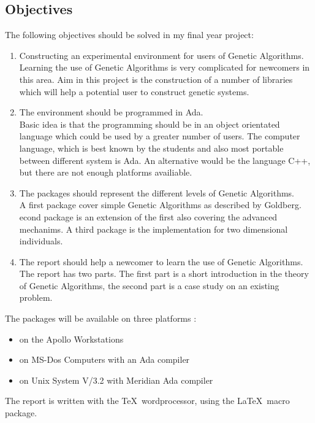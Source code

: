
\subsection{Objectives}
The following objectives should be solved in my final year project:
\begin{enumerate}
\item Constructing an experimental environment for users of Genetic Algorithms.\\
Learning the use of Genetic Algorithms is very complicated for newcomers in this
area. Aim in this project is the construction of a number of libraries which
will help a potential user to construct genetic systems.
\item The environment should be programmed in Ada.\\
Basic idea is that the programming should be in an object orientated language which could be used
by a greater number of users. The computer language, which is best known by the
students and also most portable between different system is Ada. An alternative
would be the language C++, but there are not enough platforms availiable.
\item The packages should represent the different levels of Genetic Algorithms.\\
A first package cover simple Genetic Algorithms as described by Goldberg\cite{Gol89}.
econd package is an extension of the first also covering the advanced mechanims.
A third package is the implementation for two dimensional individuals.
\item The report should help a newcomer to learn the use of Genetic Algorithms.\\
The report has two parts. The first part is a short introduction in the theory
of Genetic Algorithms, the second part is a case study on an existing problem.
\end{enumerate}
The packages will be available on three platforms :
\begin{itemize}
\item on the Apollo Workstations
\item on MS-Dos Computers with an Ada compiler
\item on Unix System V/3.2 with Meridian Ada compiler
\end{itemize}

The report is written with the \TeX \  wordprocessor, using the \LaTeX \  macro package.
